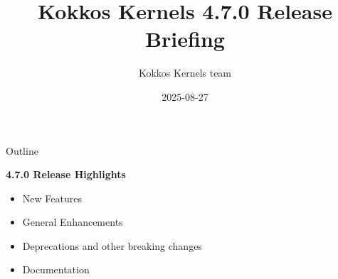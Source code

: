 
\usepackage{tikz}
\graphicspath{{kk_4_5/figures/}}


\title{Kokkos Kernels 4.7.0 Release Briefing}

\author{Kokkos Kernels team}

\date{2025-08-27}



\shorttrue
\mediumfalse
\fullfalse



\begin{frame}
  \titlepage
\end{frame}


\begin{frame}[fragile]{Outline}

  \textbf{4.7.0 Release Highlights}

  \begin{itemize}
    \item{New Features}
    \item{General Enhancements}
    \item{Deprecations and other breaking changes}
    \item{Documentation}
  \end{itemize}

\end{frame}

